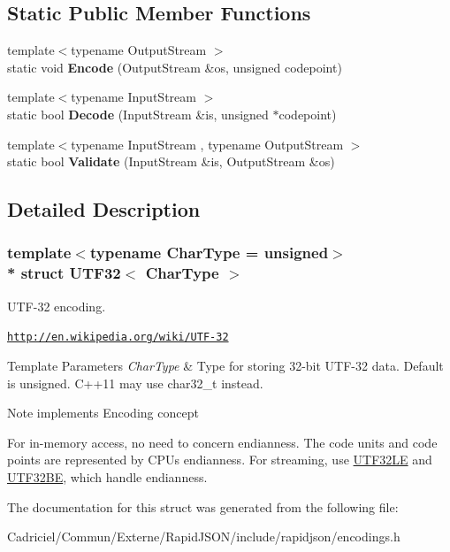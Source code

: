 \subsection*{Static Public Member Functions}
\begin{DoxyCompactItemize}
\item 
{\footnotesize template$<$typename Output\+Stream $>$ }\\static void {\bfseries Encode} (Output\+Stream \&os, unsigned codepoint)\hypertarget{struct_u_t_f32_a511d1b09672ce535085895a28d8c2f13}{}\label{struct_u_t_f32_a511d1b09672ce535085895a28d8c2f13}

\item 
{\footnotesize template$<$typename Input\+Stream $>$ }\\static bool {\bfseries Decode} (Input\+Stream \&is, unsigned $\ast$codepoint)\hypertarget{struct_u_t_f32_a6e7258a5e982e101345dffdc355e9b53}{}\label{struct_u_t_f32_a6e7258a5e982e101345dffdc355e9b53}

\item 
{\footnotesize template$<$typename Input\+Stream , typename Output\+Stream $>$ }\\static bool {\bfseries Validate} (Input\+Stream \&is, Output\+Stream \&os)\hypertarget{struct_u_t_f32_a71336fb0546b3079e01bbd51d2fa2e45}{}\label{struct_u_t_f32_a71336fb0546b3079e01bbd51d2fa2e45}

\end{DoxyCompactItemize}


\subsection{Detailed Description}
\subsubsection*{template$<$typename Char\+Type = unsigned$>$\\*
struct U\+T\+F32$<$ Char\+Type $>$}

U\+T\+F-\/32 encoding. 

\href{http://en.wikipedia.org/wiki/UTF-32}{\tt http\+://en.\+wikipedia.\+org/wiki/\+U\+T\+F-\/32} 
\begin{DoxyTemplParams}{Template Parameters}
{\em Char\+Type} & Type for storing 32-\/bit U\+T\+F-\/32 data. Default is unsigned. C++11 may use char32\+\_\+t instead. \\
\hline
\end{DoxyTemplParams}
\begin{DoxyNote}{Note}
implements Encoding concept

For in-\/memory access, no need to concern endianness. The code units and code points are represented by C\+PU\textquotesingle{}s endianness. For streaming, use \hyperlink{struct_u_t_f32_l_e}{U\+T\+F32\+LE} and \hyperlink{struct_u_t_f32_b_e}{U\+T\+F32\+BE}, which handle endianness. 
\end{DoxyNote}


The documentation for this struct was generated from the following file\+:\begin{DoxyCompactItemize}
\item 
Cadriciel/\+Commun/\+Externe/\+Rapid\+J\+S\+O\+N/include/rapidjson/encodings.\+h\end{DoxyCompactItemize}
